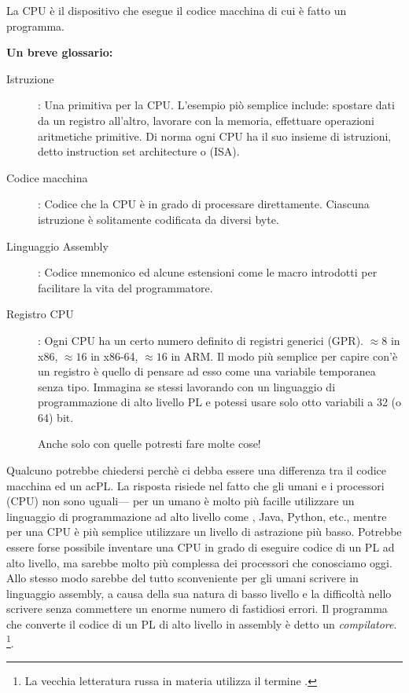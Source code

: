 
La \ac{CPU} è il dispositivo che esegue il codice macchina di cui è fatto un programma.

\textbf{Un breve glossario:}

\begin{description}
\item[Istruzione]: Una primitiva per la \ac{CPU}.
L'esempio piò semplice include: spostare dati da un registro all'altro, lavorare con la memoria, effettuare operazioni aritmetiche primitive.
Di norma ogni \ac{CPU} ha il suo insieme di istruzioni, detto instruction set architecture o (\ac{ISA}).

\item[Codice macchina]: Codice che la \ac{CPU} è in grado di processare direttamente.
Ciascuna istruzione è solitamente codificata da diversi byte.
\item[Linguaggio Assembly]: Codice mnemonico ed alcune estensioni come le macro introdotti per facilitare la vita del programmatore.
\item[Registro CPU]: Ogni \ac{CPU} ha un certo numero definito di registri generici (\ac{GPR}).
$\approx 8$ in x86, $\approx 16$ in x86-64, $\approx 16$ in ARM.
Il modo più semplice per capire con'è un registro è quello di pensare ad esso come una variabile temporanea senza tipo.
Immagina se stessi lavorando con un linguaggio di programmazione di alto livello \ac{PL} e potessi usare solo otto variabili a 32 (o 64) bit.

Anche solo con quelle potresti fare molte cose!
\end{description}


Qualcuno potrebbe chiedersi perchè ci debba essere una differenza tra il codice macchina ed un ac{PL}. La risposta risiede nel fatto che gli umani e i processori (\ac{CPU}) non sono uguali---%
per un umano è molto più facille utilizzare un linguaggio di programmazione ad alto livello come \CCpp, Java, Python, etc., mentre per una \ac{CPU} è più semplice utilizzare un livello di astrazione più basso.
Potrebbe essere forse possibile inventare una \ac{CPU} in grado di eseguire codice di un \ac{PL} ad alto livello, ma sarebbe molto più complessa dei processori che conosciamo oggi.
Allo stesso modo sarebbe del tutto sconveniente per gli umani scrivere in linguaggio assembly, a causa della sua natura di basso livello e la difficoltà nello scrivere senza commettere un enorme numero di fastidiosi errori.
Il programma che converte il codice di un \ac{PL} di alto livello in assembly è detto un \emph{compilatore}.
\footnote{La vecchia letteratura russa in materia utilizza il termine .}.

